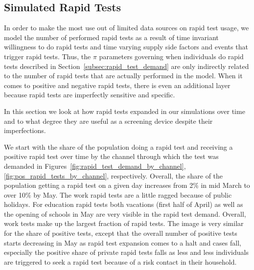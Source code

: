 \subsection{Simulated Rapid Tests}
\label{subsec:results_rapid_test_statistics}

In order to make the most use out of limited data sources on rapid test usage, we model the
number of performed rapid tests as a result of time invariant willingness to do rapid
tests and time varying supply side factors and events that trigger rapid tests. Thus, the
$\pi$ parameters governing when individuals do rapid tests described in
Section~\ref{subsec:rapid_test_demand} are only indirectly related to the number of rapid
tests that are actually performed in the model. When it comes to positive and negative
rapid tests, there is even an additional layer because rapid tests are imperfectly
sensitive and specific.

In this section we look at how rapid tests expanded in our simulations over time and to
what degree they are useful as a screening device despite their imperfections.

We start with the share of the population doing a rapid test and receiving a positive rapid
test over time by the channel through which the test
was demanded in Figures~\ref{fig:rapid_test_demand_by_channel},
\ref{fig:pos_rapid_tests_by_channel}, respectively. Overall, the share of the population
getting a rapid test on a given day increases from 2\% in mid March to over 10\% by May.
The work rapid tests are a little ragged because of public holidays. For education rapid
tests both vacations (first half of April) as well as the opening of schools in May are
very visible in the rapid test demand. Overall, work tests make up the largest fraction
of rapid tests. The image is very similar for the share of positive tests, except that
the overall number of positive tests starts decreasing in May as rapid test expansion
comes to a halt and cases fall, especially the positive share of private rapid tests
falls as less and less individuals are triggered to seek a rapid test because of a risk
contact in their household.

